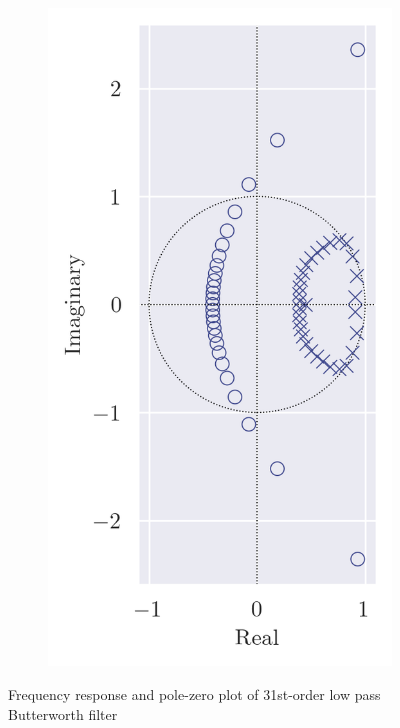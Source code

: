 \begin{figure}[ht]
\begin{subfigure}[b]{0.25\textwidth}
        \includegraphics[width=\textwidth]{images/q8_31th_zp.png}
    \end{subfigure}
    \caption{Frequency response and pole-zero plot of 31st-order low pass Butterworth filter}
\end{figure}

